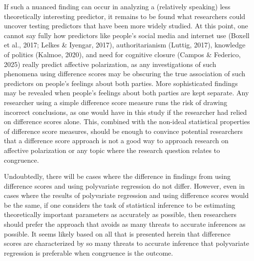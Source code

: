 \documentclass[authordate, meta]{jote-new-article}
\begin{document}
	If such a nuanced finding can occur in analyzing a (relatively speaking) less theoretically interesting predictor, it remains to be found what researchers could uncover testing predictors that have been more widely studied. At this point, one cannot say fully how predictors like people's social media and internet use (Boxell et al., 2017; Lelkes \& Iyengar, 2017), authoritarianism (Luttig, 2017), knowledge of politics (Kalmoe, 2020), and need for cognitive closure (Campos \& Federico, 2025) really predict affective polarization, as any investigations of such phenomena using difference scores may be obscuring the true association of such predictors on people's feelings about both parties. More sophisticated findings may be revealed when people's feelings about both parties are kept separate. Any researcher using a simple difference score measure runs the risk of drawing incorrect conclusions, as one would have in this study if the researcher had relied on difference scores alone. This, combined with the non-ideal statistical properties of difference score measures, should be enough to convince potential researchers that a difference score approach is not a good way to approach research on affective polarization or any topic where the research question relates to congruence.



	Undoubtedly, there will be cases where the difference in findings from using difference scores and using polyvariate regression do not differ. However, even in cases where the results of polyvariate regression and using difference scores would be the same, if one considers the task of statistical inference to be estimating theoretically important parameters as accurately as possible, then researchers should prefer the approach that avoids as many threats to accurate inferences as possible. It seems likely based on all that is presented herein that difference scores are characterized by so many threats to accurate inference that polyvariate regression is preferable when congruence is the outcome.
\end{document}
